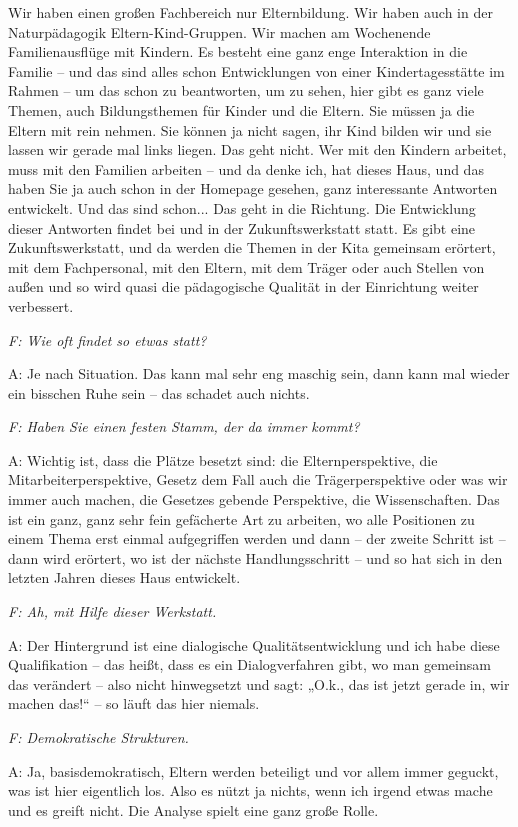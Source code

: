 \begin{linenumbers*}
Wir haben einen großen Fachbereich nur Elternbildung. Wir haben auch in der Naturpädagogik Eltern-Kind-Gruppen. Wir machen am Wochenende Familienausflüge mit Kindern. Es besteht eine ganz enge Interaktion in die Familie -- und das sind alles schon Entwicklungen von einer Kindertagesstätte im Rahmen -- um das schon zu beantworten, um zu sehen, hier gibt es ganz viele Themen, auch Bildungsthemen für Kinder und die Eltern. Sie müssen ja die Eltern mit rein nehmen. Sie können ja nicht sagen, ihr Kind bilden wir und sie lassen wir gerade mal links liegen. Das geht nicht. Wer mit den Kindern arbeitet, muss mit den Familien arbeiten -- und da denke ich, hat dieses Haus, und das haben Sie ja auch schon in der Homepage gesehen, ganz interessante Antworten entwickelt. Und das sind schon... Das geht in die Richtung. Die Entwicklung dieser Antworten findet bei und in der Zukunftswerkstatt statt. Es gibt eine Zukunftswerkstatt, und da werden die Themen in der Kita gemeinsam erörtert, mit dem Fachpersonal, mit den Eltern, mit dem Träger oder auch Stellen von außen und so wird quasi die pädagogische Qualität in der Einrichtung weiter verbessert. 

\emph{F: Wie oft findet so etwas statt?}

A: Je nach Situation. Das kann mal sehr eng maschig sein, dann kann mal wieder ein bisschen Ruhe sein -- das schadet auch nichts. 

\emph{F: Haben Sie einen festen Stamm, der da immer kommt?}

A: Wichtig ist, dass die Plätze besetzt sind: die Elternperspektive, die Mitarbeiterperspektive, Gesetz dem Fall auch die Trägerperspektive oder was wir immer auch machen, die Gesetzes gebende Perspektive, die Wissenschaften. Das ist ein ganz, ganz sehr fein gefächerte Art zu arbeiten, wo alle Positionen zu einem Thema erst einmal aufgegriffen werden und dann -- der zweite Schritt ist -- dann wird erörtert, wo ist der nächste Handlungsschritt -- und so hat sich in den letzten Jahren dieses Haus entwickelt. 

\emph{F: Ah, mit Hilfe dieser Werkstatt.} 

A: Der Hintergrund ist eine dialogische Qualitätsentwicklung und ich habe diese Qualifikation -- das heißt, dass es ein Dialogverfahren gibt, wo man gemeinsam das verändert -- also nicht hinwegsetzt und sagt: „O.k., das ist jetzt gerade in, wir machen das!“ -- so läuft das hier niemals.

\emph{F: Demokratische Strukturen.}

A: Ja, basisdemokratisch, Eltern werden beteiligt und vor allem immer geguckt, was ist hier eigentlich los. Also es nützt ja nichts, wenn ich irgend etwas mache und es greift nicht. Die Analyse spielt eine ganz große Rolle.


\end{linenumbers*}
